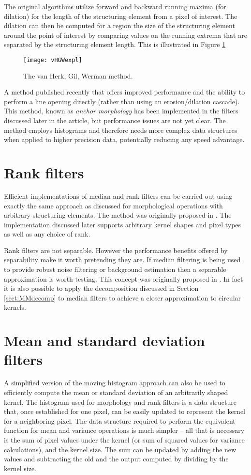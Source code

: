 \documentclass{InsightArticle}
\begin{document}
The original algorithms utilize forward and backward running maxima
(for dilation) for the length of the structuring element from a pixel
of interest. The dilation can then be computed for a region the size
of the structuring element around the point of interest by comparing
values on the running extrema that are separated by the structuring
element length. This is illustrated in Figure \ref{fig:vHGWmethod}

\begin{figure}[htbp]
\centering
\texttt{[image: vHGWexpl]}
\caption{The van Herk, Gil, Werman method.\label{fig:vHGWmethod}}
\end{figure}

A method published recently that offers improved performance
\cite{Vandroogenbroeck2005Morphological} and the ability to perform a
line opening directly (rather than using an erosion/dilation
cascade). This method, known as {\em anchor morphology} has been
implemented in the filters discussed later in the article, but
performance issues are not yet clear. The method employs histograms
and therefore needs more complex data structures when applied to
higher precision data, potentially reducing any speed advantage.

\section{Rank filters}
\label{sect:rank}
Efficient implementations of median and rank filters can be carried out
using exactly the same approach as discussed for morphological
operations with arbitrary structuring elements. The method was
originally proposed in \cite{Huang79}. The implementation discussed
later supports arbitrary kernel shapes and pixel types as well as any
choice of rank.

Rank filters are not separable. However the performance benefits
offered by separability make it worth pretending they are. If median
filtering is being used to provide robust noise filtering or
background estimation then a separable approximation is worth
testing. This concept was originally proposed in \cite{Narendra81}. In
fact it is also possible to apply the decomposition discussed in
Section \ref{sect:MMdecomp} to median filters to achieve a closer
approximation to circular kernels.

\section{Mean and standard deviation filters}
\label{sect:meanVar}
A simplified version of the moving histogram approach can also be used
to efficiently compute the mean or standard deviation of an arbitrarily shaped
kernel. The histogram used for morphology and rank filters is a data
structure that, once established for one pixel, can be easily updated
to represent the kernel for a neighboring pixel. The data structure
required to perform the equivalent function for mean and variance
operations is much simpler -- all that is necessary is the sum of
pixel values under the kernel (or sum of squared values for variance
calculations), and the kernel size. The sum can be updated by adding
the new values and subtracting the old and the output computed by
dividing by the kernel size.
\end{document}
